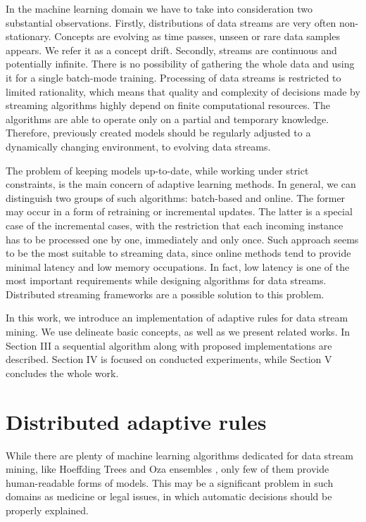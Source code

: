\documentclass[journal]{IEEEtran}
\begin{document}
In the machine learning domain we have to take into consideration two substantial observations. Firstly, distributions of data streams are very often non-stationary. Concepts are evolving as time passes, unseen or rare data samples appears. We refer it as a concept drift. Secondly, streams are continuous and potentially infinite. There is no possibility of gathering the whole data and using it for a single batch-mode training. Processing of data streams is restricted to limited rationality, which means that quality and complexity of decisions made by streaming algorithms highly depend on finite computational resources. The algorithms are able to operate only on a partial and temporary knowledge. Therefore, previously created models should be regularly adjusted to a dynamically changing environment, to evolving data streams.

The problem of keeping models up-to-date, while working under strict constraints, is the main concern of adaptive learning methods. In general, we can distinguish two groups of such algorithms: batch-based and online. The former may occur in a form of retraining or incremental updates. The latter is a special case of the incremental cases, with the restriction that each incoming instance has to be processed one by one, immediately and only once. Such approach seems to be the most suitable to streaming data, since online methods tend to provide minimal latency and low memory occupations. In fact, low latency is one of the most important requirements while designing algorithms for data streams. Distributed streaming frameworks are a possible solution to this problem.

In this work, we introduce an implementation of adaptive rules for data stream mining. We use delineate basic concepts, as well as we present related works. In Section III a sequential algorithm along with proposed implementations are described. Section IV is focused on conducted experiments, while Section V concludes the whole work.

\section{Distributed adaptive rules}

While there are plenty of machine learning algorithms dedicated for data stream mining, like Hoeffding Trees \cite{Domingos:2000} and Oza ensembles \cite{OzaR:2001}, only few of them provide human-readable forms of models. This may be a significant problem in such domains as medicine or legal issues, in which automatic decisions should be properly explained.
\end{document}
